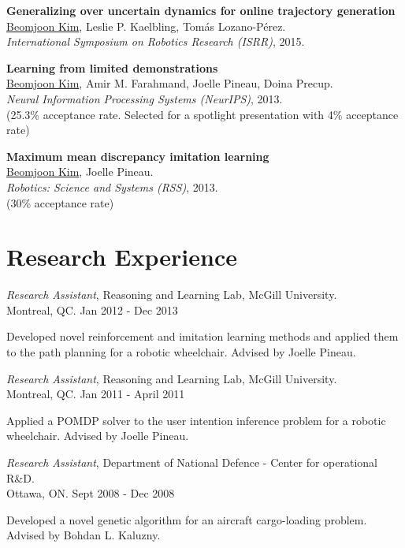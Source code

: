 \documentclass[line,margin,letterpaper]{res}
\begin{document}
\begin{resume}
\textbf{Generalizing over uncertain dynamics for online trajectory generation}\\
\underline{Beomjoon Kim}, Leslie P. Kaelbling, Tom\'as Lozano-P\'erez.\\
{\sl International Symposium on Robotics Research (ISRR)}, 2015.

\textbf{Learning from limited demonstrations}\\
\underline{Beomjoon Kim}, Amir M. Farahmand, Joelle Pineau, Doina Precup.\\
{\sl Neural Information Processing Systems (NeurIPS)}, 2013.\\
{\small (25.3\% acceptance rate. Selected for a spotlight presentation with 4\% acceptance rate)}

\textbf{Maximum mean discrepancy imitation learning}\\
\underline{Beomjoon Kim}, Joelle Pineau.\\
{\sl  Robotics: Science and Systems (RSS)}, 2013.\\
{\small (30\% acceptance rate)}

\section{Research Experience}


{\sl Research Assistant}, Reasoning and Learning Lab, McGill University.
\\ \hfill Montreal, QC. Jan 2012 - Dec 2013
\begin{list}{}
\item Developed novel reinforcement and imitation learning methods and applied them to the path planning for a robotic wheelchair. Advised by Joelle Pineau.
\end{list}

{\sl Research Assistant}, Reasoning and Learning Lab, McGill University.
\\ \hfill Montreal, QC. Jan 2011 - April 2011
\begin{list}{}
\item Applied a POMDP solver to the user intention inference problem for a robotic wheelchair. Advised by Joelle Pineau.
\end{list}

{\sl Research Assistant}, Department of National Defence - Center for operational R\&D.
\\ \hfill Ottawa, ON. Sept 2008 - Dec 2008
\begin{list}{}
\item Developed a novel genetic algorithm for an aircraft cargo-loading problem.  Advised by Bohdan L. Kaluzny.
\end{list}


\end{resume}
\end{document}
